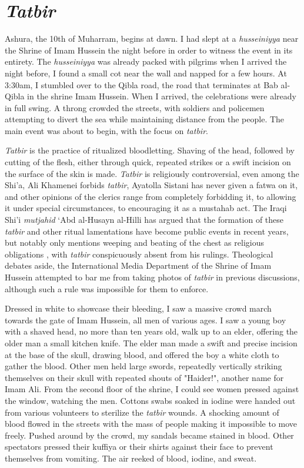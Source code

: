 \section{\emph{Tatbir}}
Ashura, the 10th of Muharram, begins at dawn. I had slept at a \emph{husseiniyya} near the Shrine of Imam Hussein the night before in order to witness the event in its entirety. The \emph{husseiniyya} was already packed with pilgrims when I arrived the night before, I found a small cot near the wall and napped for a few hours. At 3:30am, I stumbled over to the Qibla road, the road that terminates at Bab al-Qibla in the shrine Imam Hussein. When I arrived, the celebrations were already in full swing. A throng crowded the streets, with soldiers and policemen attempting to divert the sea while maintaining distance from the people. The main event was about to begin, with the focus on \emph{tatbir}. 

\emph{Tatbir} is the practice of ritualized bloodletting. Shaving of the head, followed by cutting of the flesh, either through quick, repeated strikes or a swift incision on the surface of the skin is made. \emph{Tatbir} is religiously controversial, even among the Shi'a, Ali Khamenei forbids \emph{tatbir}, Ayatolla Sistani has never given a fatwa on it, and other opinions of the clerics range from completely forbidding it, to allowing it under special circumstances, to encouraging it as a mustahab act. The Iraqi Shi'i \emph{mutjahid} ‘Abd al-Husayn al-Hilli has argued that the formation of these \emph{tatbir} and other ritual lamentations have become public events in recent years, but notably only mentions weeping and beating of the chest as religious obligations \cite[85]{weiss_shadow_2010}, with \emph{tatbir} conspicuously absent from his rulings. Theological debates aside, the International Media Department of the Shrine of Imam Hussein attempted to bar me from taking photos of \emph{tatbir} in previous discussions, although such a rule was impossible for them to enforce. 

Dressed in white to showcase their bleeding, I saw a massive crowd march towards the gate of Imam Hussein, all men of various ages. I saw a young boy with a shaved head, no more than ten years old, walk up to an elder, offering the older man a small kitchen knife. The elder man made a swift and precise incision at the base of the skull, drawing blood, and offered the boy a white cloth to gather the blood. Other men held large swords, repeatedly vertically striking themselves on their skull with repeated shouts of "Haider!", another name for Imam Ali. From the second floor of the shrine, I could see women pressed against the window, watching the men. Cottons swabs soaked in iodine were handed out from various volunteers to sterilize the \emph{tatbir} wounds. A shocking amount of blood flowed in the streets with the mass of people making it impossible to move freely. Pushed around by the crowd, my sandals became stained in blood. Other spectators pressed their kuffiya or their shirts against their face to prevent themselves from vomiting. The air reeked of blood, iodine, and sweat. 

